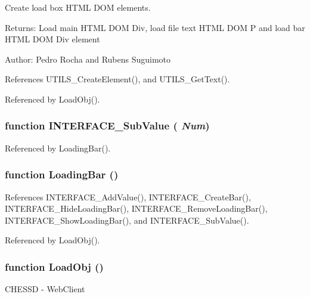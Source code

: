 Create load box HTML DOM elements. 

\begin{Desc}
\item[Returns:]Load main HTML DOM Div, load file text HTML DOM P and load bar HTML DOM Div element \end{Desc}
\begin{Desc}
\item[Author:]Pedro Rocha and Rubens Suguimoto \end{Desc}


References UTILS\_\-CreateElement(), and UTILS\_\-GetText().

Referenced by LoadObj().
\subsubsection[INTERFACE\_\-SubValue]{\setlength{\rightskip}{0pt plus 5cm}function INTERFACE\_\-SubValue ( {\em Num})}\label{interface_2load_8js_d352d65894f8136e242358d514827ec7}




Referenced by LoadingBar().
\subsubsection[LoadingBar]{\setlength{\rightskip}{0pt plus 5cm}function LoadingBar ()}\label{interface_2load_8js_6ddfca4197e38080cc511c5744f1fcbd}




References INTERFACE\_\-AddValue(), INTERFACE\_\-CreateBar(), INTERFACE\_\-HideLoadingBar(), INTERFACE\_\-RemoveLoadingBar(), INTERFACE\_\-ShowLoadingBar(), and INTERFACE\_\-SubValue().

Referenced by LoadObj().
\subsubsection[LoadObj]{\setlength{\rightskip}{0pt plus 5cm}function LoadObj ()}\label{interface_2load_8js_dfb5ca7a3a80d3689f795a4bd545b144}


CHESSD - WebClient

